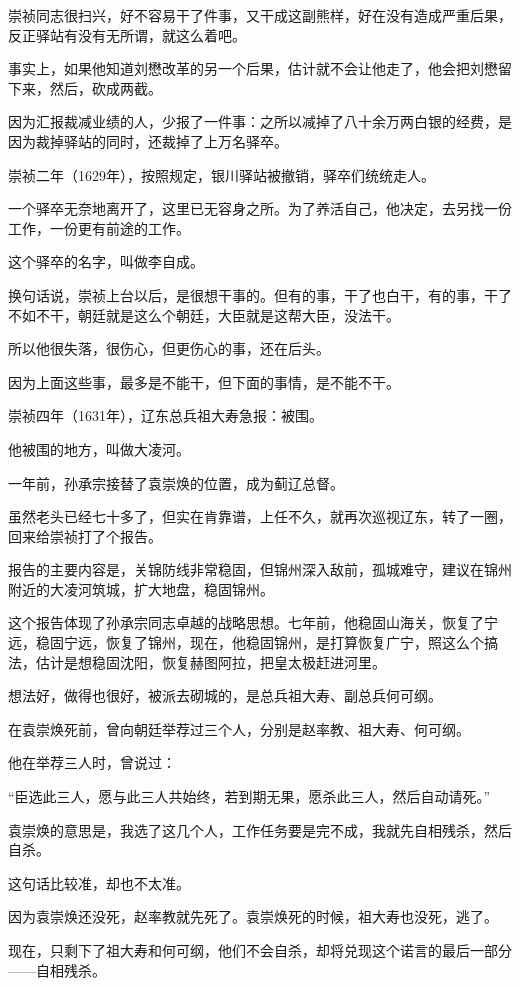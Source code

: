 \begin{multicols}{\theparacolNo}
		崇祯同志很扫兴，好不容易干了件事，又干成这副熊样，好在没有造成严重后果，反正驿站有没有无所谓，就这么着吧。

		事实上，如果他知道刘懋改革的另一个后果，估计就不会让他走了，他会把刘懋留下来，然后，砍成两截。

		因为汇报裁减业绩的人，少报了一件事：之所以减掉了八十余万两白银的经费，是因为裁掉驿站的同时，还裁掉了上万名驿卒。

		崇祯二年（1629年），按照规定，银川驿站被撤销，驿卒们统统走人。

		一个驿卒无奈地离开了，这里已无容身之所。为了养活自己，他决定，去另找一份工作，一份更有前途的工作。

		这个驿卒的名字，叫做李自成。

		换句话说，崇祯上台以后，是很想干事的。但有的事，干了也白干，有的事，干了不如不干，朝廷就是这么个朝廷，大臣就是这帮大臣，没法干。

		所以他很失落，很伤心，但更伤心的事，还在后头。

		因为上面这些事，最多是不能干，但下面的事情，是不能不干。

		崇祯四年（1631年），辽东总兵祖大寿急报：被围。

		他被围的地方，叫做大凌河。

		一年前，孙承宗接替了袁崇焕的位置，成为蓟辽总督。

		虽然老头已经七十多了，但实在肯靠谱，上任不久，就再次巡视辽东，转了一圈，回来给崇祯打了个报告。

		报告的主要内容是，关锦防线非常稳固，但锦州深入敌前，孤城难守，建议在锦州附近的大凌河筑城，扩大地盘，稳固锦州。

		这个报告体现了孙承宗同志卓越的战略思想。七年前，他稳固山海关，恢复了宁远，稳固宁远，恢复了锦州，现在，他稳固锦州，是打算恢复广宁，照这么个搞法，估计是想稳固沈阳，恢复赫图阿拉，把皇太极赶进河里。

		想法好，做得也很好，被派去砌城的，是总兵祖大寿、副总兵何可纲。

		在袁崇焕死前，曾向朝廷举荐过三个人，分别是赵率教、祖大寿、何可纲。

		他在举荐三人时，曾说过：

		“臣选此三人，愿与此三人共始终，若到期无果，愿杀此三人，然后自动请死。”

		袁崇焕的意思是，我选了这几个人，工作任务要是完不成，我就先自相残杀，然后自杀。

		这句话比较准，却也不太准。

		因为袁崇焕还没死，赵率教就先死了。袁崇焕死的时候，祖大寿也没死，逃了。

		现在，只剩下了祖大寿和何可纲，他们不会自杀，却将兑现这个诺言的最后一部分——自相残杀。
		\ifnum{}
	\end{multicols}
\fi
\newpage
